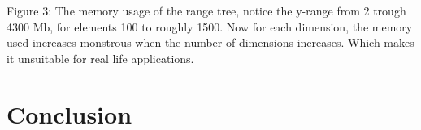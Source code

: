 \documentclass{article}
\begin{document}
Figure 3: The memory usage of the range tree, notice the y-range from 2 trough 4300 Mb, for elements 100 to roughly 1500.
Now for each dimension, the memory used increases monstrous when the number of dimensions increases. Which makes it unsuitable for real life applications.
\newpage
\section{Conclusion}
\end{document}
